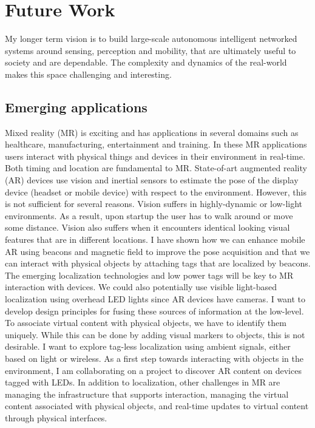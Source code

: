 \documentclass[10pt]{article}
\begin{document}

\section{Future Work}
My longer term vision is to build large-scale autonomous intelligent networked systems around sensing, perception and mobility, that are ultimately useful to society and are dependable. %
The complexity and dynamics of the real-world makes this space challenging and interesting. %

\subsection{Emerging applications}
Mixed reality (MR) is exciting and has applications in several domains such as healthcare, manufacturing, entertainment and training. In these MR applications users interact with physical things and devices in their environment in real-time. %
Both timing and location are fundamental to MR. State-of-art augmented reality (AR) devices use vision and inertial sensors to estimate the pose of the display device (headset or mobile device) with respect to the environment. However, this is not sufficient for several reasons. Vision suffers in highly-dynamic or low-light environments. As a result, upon startup the user has to walk around or move some distance. Vision also suffers when it encounters identical looking visual features that are in different locations. I have shown how we can enhance mobile AR using beacons and magnetic field to improve the pose acquisition \cite{} and that we can interact with physical objects by attaching tags that are localized by beacons. The emerging localization technologies and low power tags will be key to MR interaction with devices. We could also potentially use visible light-based localization using overhead LED lights since AR devices have cameras. I want to develop design principles for fusing these sources of information at the low-level. To associate virtual content with physical objects, we have to identify them uniquely. While this can be done by adding visual markers to objects, this is not desirable. I want to explore tag-less localization using ambient signals, either based on light or wireless. As a first step towards interacting with objects in the environment, I am collaborating on a project to discover AR content on devices tagged with LEDs. In addition to localization, other challenges in MR are managing the infrastructure that supports interaction, managing the virtual content associated with physical objects, and real-time updates to virtual content through physical interfaces.
\end{document}
